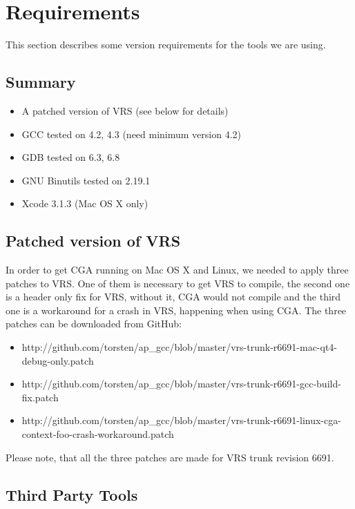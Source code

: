 
\section{Requirements} This section describes some version requirements for the tools we are using. 

\subsection{Summary}
\begin{itemize}
  \item A patched version of VRS (see below for details)
	\item GCC tested on 4.2, 4.3 (need minimum version 4.2)
	\item GDB tested on 6.3, 6.8
	\item GNU Binutils tested on 2.19.1
	\item Xcode 3.1.3 (Mac OS X only)
\end{itemize}

\subsection{Patched version of VRS}

In order to get CGA running on Mac OS X and Linux, we needed to apply three patches to VRS. One of them is necessary to get VRS to compile, the second one is a header only fix for VRS, without it, CGA would not compile and the third one is a workaround for a crash in VRS, happening when using CGA. The three patches can be downloaded from GitHub:

\begin{itemize}
\item http://github.com/torsten/ap\_gcc/blob/master/vrs-trunk-r6691-mac-qt4-debug-only.patch
\item http://github.com/torsten/ap\_gcc/blob/master/vrs-trunk-r6691-gcc-build-f{}ix.patch
\item http://github.com/torsten/ap\_gcc/blob/master/vrs-trunk-r6691-linux-cga-context-foo-crash-workaround.patch
\end{itemize}

Please note, that all the three patches are made for VRS trunk revision 6691.

\subsection{Third Party Tools}

